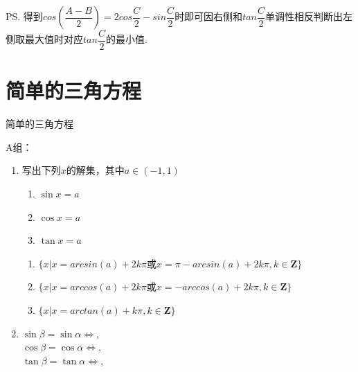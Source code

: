 \begin{enumerate}
\begin{jieda}
\begin{enumerate}
            \ps 得到$cos\left(\dfrac{A-B}{2}\right) = 2cos\dfrac{C}{2} - sin\dfrac{C}{2}$时即可因右侧和$tan\dfrac{C}{2}$单调性相反判断出左侧取最大值时对应$tan\dfrac{C}{2}$的最小值.
        \end{enumerate}
    \end{jieda}
\end{enumerate}

\clearpage

\section{简单的三角方程}
\zsd 简单的三角方程

A组：
\begin{enumerate}
\item 写出下列$x$的解集，其中$a\in (-1,1)$
\begin{enumerate}[(1)]
    \item $\sin x=a$
    \item $\cos x=a$
    \item $\tan x =a$
\end{enumerate}
\begin{jieda}
    \begin{enumerate}
        \item $\{x | x = arcsin(a) + 2k\pi \mbox{或} x = \pi - arcsin(a) + 2k\pi, k \in \mathbf{Z}\}$
        \item $\{x | x = arccos(a) + 2k\pi \mbox{或} x = - arccos(a) + 2k\pi, k \in \mathbf{Z}\}$
        \item $\{x | x = arctan(a) + k\pi, k \in \mathbf{Z}\}$
    \end{enumerate}
\end{jieda}

\item $\sin\beta=\sin\alpha\iff$, \\
$\cos\beta=\cos\alpha\iff$, \\
$\tan\beta=\tan\alpha\iff$, \\

\end{enumerate}

